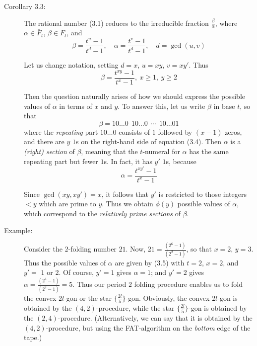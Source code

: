\begin{description}

  \item[Corollary 3.3:] The rational number (3.1) reduces to the irreducible fraction $\frac{\beta}{\alpha}$, where $\alpha \in \bar{F}_{t}$, $\beta \in F_{t}$, and
    \begin{equation}
    \beta = \frac{t^{u}-1}{t^{d}-1}, \quad  \alpha = \frac{t^{v}-1}{t^{d}-1}, \quad  d = \gcd(u,v)  \tag{3.2}
    \end{equation}

    Let us change notation, setting $d = x$, $u = xy$, $v = xy'$. Thus
    \begin{equation}
    \beta = \frac{t^{xy}-1}{t^{x}-1},\ x \geq 1,\ y \geq 2  \tag{3.3}
    \end{equation}

    Then the question naturally arises of how we should express the possible values of $\alpha$ in terms of $x$ and $y$. To answer this, let us write $\beta$ in base $t$, so that
    \begin{equation}
    \beta = 10\ldots0\ \ 10\ldots0\ \ \cdots\ \ 10\ldots01  \tag{3.4}
    \end{equation}
    where the \emph{repeating} part $10\ldots0$ consists of $1$ followed by $(x-1)$ zeros, and there are $y$ $1$s on the right-hand side of equation (3.4). Then $\alpha$ is a \emph{(right) section} of $\beta$, meaning that the $t$-numeral for $\alpha$ has the same repeating part but fewer $1$s. In fact, it has $y'$ $1$s, because
    \begin{equation}
    \alpha = \frac{t^{xy'}-1}{t^{x}-1}  \tag{3.5}
    \end{equation}

    Since $\gcd (xy,xy') = x$, it follows that $y'$ is restricted to those integers $< y$ which are prime to $y$. Thus we obtain $\phi(y)$ possible values of $\alpha$, which correspond to the \emph{relatively prime sections} of $\beta$.

  \item[Example:] Consider the $2$-folding number $21$. Now, $21 = \frac{(2^{6}-1)}{(2^{2}-1)}$, so that $x = 2$, $y = 3$. Thus the possible values of $\alpha$ are given by (3.5) with $t = 2$, $x = 2$, and $y' =$ $1$ or $2$. Of course, $y' = 1$ gives $\alpha = 1$; and $y' = 2$ gives $\alpha = \frac{(2^{4}-1)}{(2^{2}-1)} = 5$. Thus our period $2$ folding procedure enables us to fold the convex $2l$-gon or the star $\{ \frac{2l}{5} \}$-gon. Obviously, the convex $2l$-gon is obtained by the $(4,2)$-procedure, while the star $\{ \frac{2l}{5} \}$-gon is obtained by the $(2,4)$-procedure. (Alternatively, we can say that it is obtained by the $(4,2)$-procedure, but using the FAT-algorithm on the \emph{bottom} edge of the tape.)

\end{description}

